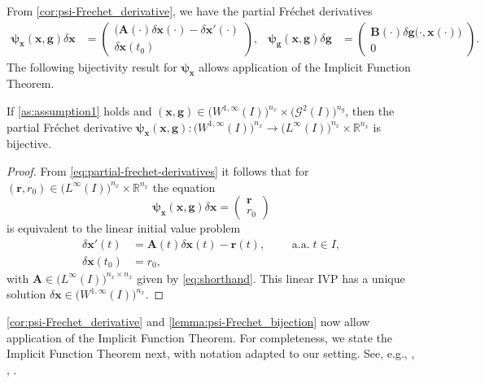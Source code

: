 \documentclass[onefignum,onetabnum]{siamart220329}
\numberwithin{equation}{section}
\newcommand{\aall}{\mbox{ a.a.} \;}
\newcommand {\real} {\mathbb{R}}
\newcommand{\bg}{\ensuremath{\mathbf{g}}} %
\newcommand{\br}{\ensuremath{\mathbf{r}}} %
\newcommand{\bx}{\ensuremath{\mathbf{x}}} %
\newcommand {\bpsi} {\boldsymbol{\psi}}
\newcommand{\BA}{\ensuremath{\mathbf{A}} } %
\newcommand{\BB}{\ensuremath{\mathbf{B}} } %
\newcommand {\cG} {\mathcal{G}}
\newcommand{\WW}{\big( W^{1, \infty}(I) \big)^{n_x}}
\newcommand{\LL}{\big(L^\infty(I) \big)^{n_x}}
\begin{document}
From \cref{cor:psi-Frechet_derivative}, we have the partial Fr\'echet derivatives
\begin{equation} \label{eq:partial-frechet-derivatives}
\begin{aligned}
	\bpsi_\bx(\bx, \bg) \delta \bx 
	&= \begin{pmatrix} \Big(  \BA(\cdot)  \delta \bx(\cdot) - \delta \bx'(\cdot) \\  \delta \bx(t_0) \end{pmatrix}, &
	\bpsi_\bg(\bx, \bg) \delta \bg 
	&= \begin{pmatrix} \BB(\cdot)  \delta \bg\big( \cdot, \bx(\cdot) \big) \\ 0 \end{pmatrix}.
\end{aligned}
\end{equation}
The following bijectivity result for $\bpsi_\bx$ allows application of the Implicit Function Theorem.

\begin{lemma} \label{lemma:psi-Frechet_bijection}
If \cref{as:assumption1}  holds and $(\bx, \bg) \in  \WW \times \big(\cG^2(I)\big)^{n_g}$,
then the partial Fr\'echet derivative $\bpsi_\bx(\bx, \bg) : \big(W^{1, \infty}(I) \big)^{n_x} \rightarrow \big(L^\infty(I) \big)^{n_x} \times \real^{n_x}$ is bijective.
\end{lemma}
\begin{proof}
	From \cref{eq:partial-frechet-derivatives} it follows that for $(\br, r_0) \in \LL  \times \real^{n_x}$ the equation
	\[
	\bpsi_\bx(\bx, \bg) \delta \bx  = \begin{pmatrix} \br \\ r_0 \end{pmatrix}
	 \]
	is equivalent to the linear initial value problem
	 \begin{align*}
	 	\delta \bx'(t) &= \BA(t) \delta \bx(t) - \br(t), \qquad \aall t \in I, \\
	 	\delta \bx(t_0) &= r_0,
	 \end{align*}
	 with $\BA \in \big(L^\infty(I) \big)^{n_x \times n_x}$ given by \cref{eq:shorthand}.
	 This linear IVP has a unique
	 solution  $\delta \bx \in \WW$.
\end{proof}

\cref{cor:psi-Frechet_derivative} and \cref{lemma:psi-Frechet_bijection} now allow 
application of the Implicit Function Theorem. For completeness, we state  the Implicit Function Theorem
next, with notation adapted to our setting. See, e.g., \cite[Thm.~2.1.14]{MGerdts_2012a},
\cite[Thm.~4.E, p.~250]{EZeidler_1995b}, \cite[Thm.~3.4.10]{SGKrantz_HRParks_2013a}.
\end{document}
